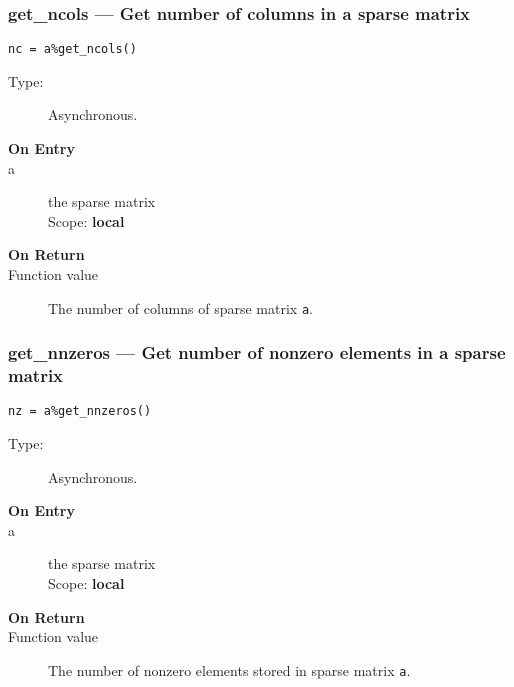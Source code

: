 \subsubsection*{get\_ncols --- Get number of  columns in a  sparse
  matrix}

\begin{verbatim}
nc = a%get_ncols()
\end{verbatim}

\begin{description}
\item[Type:] Asynchronous.
\item[\bf On Entry]
\item[a] the sparse matrix\\
Scope: {\bf local}\\
\end{description}

\begin{description}
\item[\bf On Return]
\item[Function value] The number of  columns  of sparse matrix \verb|a|.
\end{description}


\subsubsection*{get\_nnzeros --- Get number of nonzero elements
  in a sparse matrix}

\begin{verbatim}
nz = a%get_nnzeros()
\end{verbatim}

\begin{description}
\item[Type:] Asynchronous.
\item[\bf On Entry]
\item[a] the sparse matrix\\
Scope: {\bf local}\\
\end{description}

\begin{description}
\item[\bf On Return]
\item[Function value] The number of nonzero elements stored in sparse matrix \verb|a|.
\end{description}

